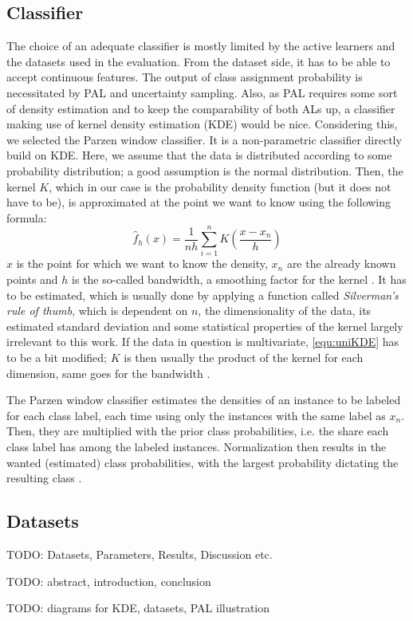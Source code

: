 \subsection{Classifier}
\label{evaluation:classifier}
The choice of an adequate classifier is mostly limited by the active learners and the datasets used in the evaluation. From the dataset side, it has to be able to accept continuous features. The output of class assignment probability is necessitated by PAL and uncertainty sampling. Also, as PAL requires some sort of density estimation and to keep the comparability of both ALs up, a classifier making use of kernel density estimation (KDE) would be nice. Considering this, we selected the Parzen window classifier. It is a non-parametric classifier directly build on KDE. Here, we assume that the data is distributed according to some probability distribution; a good assumption is the normal distribution. Then, the kernel $K$, which in our case is the probability density function (but it does not have to be), is approximated at the point we want to know using the following formula:
\begin{equation}
\label{equ:uniKDE}
\hat{f}_h(x) = \frac{1}{nh} \sum_{i=1}^{n} K(\frac{x-x_n}{h})
\end{equation}
$x$ is the point for which we want to know the density, $x_n$ are the already known points and $h$ is the so-called bandwidth, a smoothing factor for the kernel \cite{SheatherEtAl1991}. It has to be estimated, which is usually done by applying a function called \textit{Silverman's rule of thumb}, which is dependent on $n$, the dimensionality of the data, its estimated standard deviation and some statistical properties of the kernel largely irrelevant to this work. If the data in question is multivariate, \eqref{equ:uniKDE} has to be a bit modified; $K$ is then usually the product of the kernel for each dimension, same goes for the bandwidth \cite{Silverman1986}.

The Parzen window classifier estimates the densities of an instance to be labeled for each class label, each time using only the instances with the same label as $x_n$. Then, they are multiplied with the prior class probabilities, i.e. the share each class label has among the labeled instances. Normalization then results in the wanted (estimated) class probabilities, with the largest probability dictating the resulting class \cite{ArchambeauEtAl2006}.

\subsection{Datasets}

TODO: Datasets, Parameters, Results, Discussion etc.

TODO: abstract, introduction, conclusion

TODO: diagrams for KDE, datasets, PAL illustration